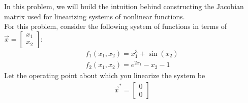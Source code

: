 

In this problem, we will build the intuition behind constructing the Jacobian matrix used for linearizing systems of nonlinear functions. \\
\newline
For this problem, consider the following system of functions in terms of $\vec{x} = \begin{bmatrix} x_1 \\ x_2 \end{bmatrix}$:
\begin{align*}
    f_1(x_1, x_2) = x_1^3 + \sin(x_2) \\
    f_2(x_1, x_2) = e^{2x_1} - x_2 - 1
\end{align*}
Let the operating point about which you linearize the system be
\begin{align*}
    \vec{x}^{*} = \begin{bmatrix} 0 \\ 0 \end{bmatrix}
\end{align*}

